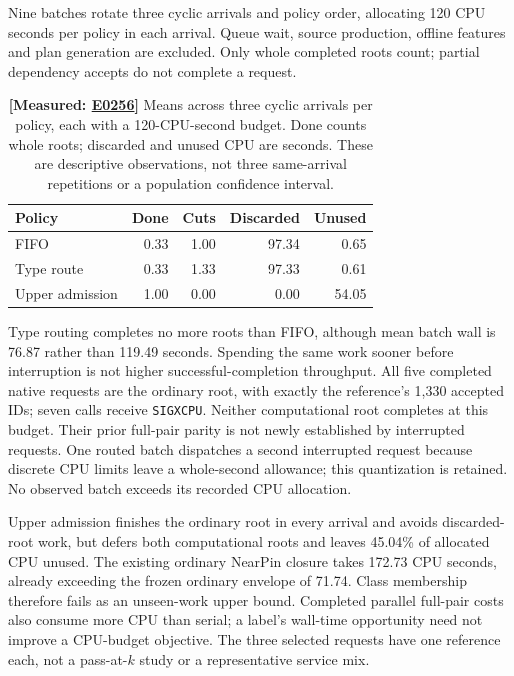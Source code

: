 \documentclass[10pt,twocolumn]{article}
\newcommand{\measured}[1]{\textbf{[Measured: #1]}}
\newcommand{\expref}[2]{\href{https://github.com/yunwei37/proofserve/blob/main/docs/tmp/build-and-evaluate/step-#1/step-report.md}{E#2}}
\begin{document}
Nine batches rotate three cyclic arrivals and policy order, allocating
120 CPU seconds per policy in each arrival. Queue wait, source production,
offline features and plan generation are excluded. Only whole completed roots
count; partial dependency accepts do not complete a request.

\begin{table}[t]
\centering\small
\setlength{\tabcolsep}{3pt}
\begin{tabular}{lrrrr}
\toprule
Policy & Done & Cuts & Discarded & Unused\\
\midrule
FIFO &0.33&1.00&97.34&0.65\\
Type route &0.33&1.33&97.33&0.61\\
Upper admission &1.00&0.00&0.00&54.05\\
\bottomrule
\end{tabular}
\caption{\measured{\expref{0256-20261101T205729+0000}{0256}} Means across three cyclic arrivals per
policy, each with a 120-CPU-second budget. Done counts whole roots;
discarded and unused CPU are seconds. These are descriptive observations,
not three same-arrival repetitions or a population confidence interval.}
\label{tab:class-admission}
\end{table}

Type routing completes no more roots than FIFO, although mean batch wall
is 76.87 rather than 119.49 seconds. Spending the same work sooner before
interruption is not higher successful-completion throughput.
All five completed native requests are the ordinary root, with exactly
the reference's 1,330 accepted IDs; seven calls receive \texttt{SIGXCPU}.
Neither computational root completes at this budget. Their prior full-pair
parity is not newly established by interrupted requests.
One routed batch dispatches a second interrupted request because discrete
CPU limits leave a whole-second allowance; this quantization is retained.
No observed batch exceeds its recorded CPU allocation.

Upper admission finishes the ordinary root in every arrival and avoids
discarded-root work, but defers both computational roots and leaves
45.04\% of allocated CPU unused. The existing ordinary NearPin closure takes
172.73 CPU seconds, already exceeding the frozen ordinary envelope of 71.74.
Class membership therefore fails as an unseen-work upper bound.
Completed parallel full-pair costs also consume more CPU than serial;
a label's wall-time opportunity need not improve a CPU-budget objective.
The three selected requests have one reference each, not a pass-at-$k$ study
or a representative service mix.
\end{document}
